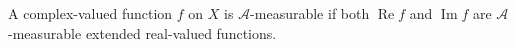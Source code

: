 A complex-valued function $f$ on $X$ is $\mathcal{A}$-measurable if both $\operatorname{Re} f$ and $\operatorname{Im} f$ are $\mathcal{A}$-measurable extended real-valued functions.